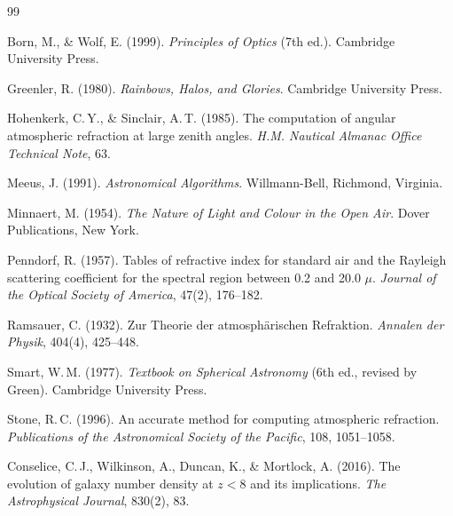 \documentclass[12pt,a4paper]{article}
\begin{document}

\begin{thebibliography}{99}

Born, M., \& Wolf, E. (1999).
\newblock \textit{Principles of Optics} (7th ed.).
\newblock Cambridge University Press.
\newblock {}

Greenler, R. (1980).
\newblock \textit{Rainbows, Halos, and Glories}.
\newblock Cambridge University Press.

Hohenkerk, C.\,Y., \& Sinclair, A.\,T. (1985).
\newblock The computation of angular atmospheric refraction at large
  zenith angles.
\newblock \textit{H.M. Nautical Almanac Office Technical Note}, 63.

Meeus, J. (1991).
\newblock \textit{Astronomical Algorithms}.
\newblock Willmann-Bell, Richmond, Virginia.

Minnaert, M. (1954).
\newblock \textit{The Nature of Light and Colour in the Open Air}.
\newblock Dover Publications, New York.

Penndorf, R. (1957).
\newblock Tables of refractive index for standard air and the Rayleigh
  scattering coefficient for the spectral region between 0.2 and 20.0 $\mu$.
\newblock \textit{Journal of the Optical Society of America}, 47(2), 176--182.
\newblock {}

Ramsauer, C. (1932).
\newblock Zur Theorie der atmosphärischen Refraktion.
\newblock \textit{Annalen der Physik}, 404(4), 425--448.

Smart, W.\,M. (1977).
\newblock \textit{Textbook on Spherical Astronomy} (6th ed., revised by Green).
\newblock Cambridge University Press.

Stone, R.\,C. (1996).
\newblock An accurate method for computing atmospheric refraction.
\newblock \textit{Publications of the Astronomical Society of the Pacific},
  108, 1051--1058.
\newblock {}

Conselice, C.\,J., Wilkinson, A., Duncan, K., \& Mortlock, A. (2016).
\newblock The evolution of galaxy number density at $z < 8$ and its
  implications.
\newblock \textit{The Astrophysical Journal}, 830(2), 83.
\newblock {}


\end{thebibliography}
\end{document}
